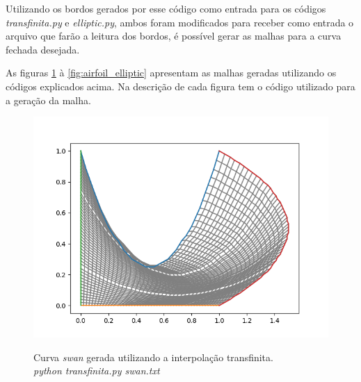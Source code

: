 \documentclass[a4paper]{article}
\begin{document}
Utilizando os bordos gerados por esse código como entrada para os códigos \textit{transfinita.py} e \textit{elliptic.py}, ambos foram modificados para receber como entrada o arquivo que farão a leitura dos bordos, é possível gerar as malhas para a curva fechada desejada.

As figuras \ref{fig:swan_transfinita} à \ref{fig:airfoil_elliptic} apresentam as malhas geradas utilizando os códigos explicados acima. Na descrição de cada figura tem o código utilizado para a geração da malha.

\begin{figure}[]
	\centering
	\includegraphics[width=1.0\textwidth]{swan_transfinita.png}
	\label{fig:swan_transfinita} 
	\caption[caption]{Curva \textit{swan} gerada utilizando a interpolação transfinita. \\\hspace{\textwidth} \textit{python transfinita.py swan.txt}}
\end{figure}
\end{document}

